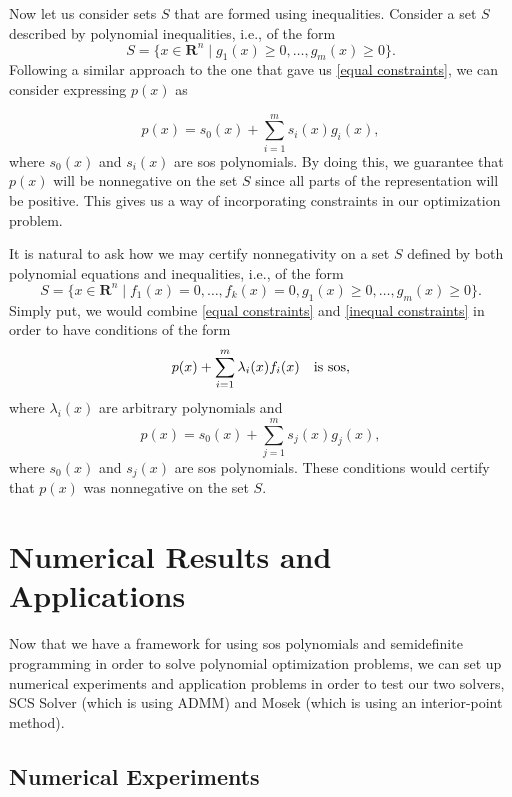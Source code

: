 	Now let us consider sets $S$ that are formed using inequalities. Consider a set $S$ described by polynomial inequalities, i.e., of the form
	$$
	S = \{x \in \mathbf{R}^n \mid g_1(x) \geq 0, \dots, g_m(x) \geq 0\}.
	$$
	Following a similar approach to the one that gave us \eqref{equal constraints}, we can consider expressing $p(x)$ as 
	
	\begin{equation} \label{inequal constraints}
		p(x) = s_0 (x) + \sum_{i=1}^{m} s_i (x) g_i (x),
	\end{equation}
	where $s_0 (x)$ and $s_i (x)$ are sos polynomials. By doing this, we guarantee that $p(x)$ will be nonnegative on the set $S$ since all parts of the representation will be positive. This gives us a way of incorporating constraints in our optimization problem.
	
	It is natural to ask how we may certify nonnegativity on a set $S$ defined by both polynomial equations and inequalities, i.e., of the form 
	$$
	S = \{x \in \mathbf{R}^n \mid f_1 (x) = 0, \dots, f_k (x) = 0, g_1 (x) \geq 0, \dots, g_m (x) \geq 0\}.
	$$
	Simply put, we would combine \eqref{equal constraints} and \eqref{inequal constraints} in order to have conditions of the form
	\begin{equation}
		p(x) + \sum_{i=1}^{m} \lambda_i(x) f_i(x) \quad \textnormal{is sos},
	\end{equation}
	where $\lambda_i (x)$ are arbitrary polynomials and 
	\begin{equation}
		p(x) = s_0 (x) + \sum_{j=1}^{m} s_j (x) g_j (x),
	\end{equation}
	where $s_0 (x)$ and $s_j (x)$ are sos polynomials. These conditions would certify that $p(x)$ was nonnegative on the set $S$.
	
	\section{Numerical Results and Applications}
	
	Now that we have a framework for using sos polynomials and semidefinite programming in order to solve polynomial optimization problems, we can set up numerical experiments and application problems in order to test our two solvers, SCS Solver (which is using ADMM) and Mosek (which is using an interior-point method).
	
		\subsection{Numerical Experiments}
		
